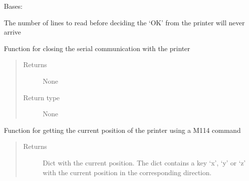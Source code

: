 \documentclass[letterpaper,10pt,english]{sphinxmanual}
\begin{document}
\begin{fulllineitems}
\label{\detokenize{index:diabase.diabase}}
\sphinxAtStartPar
Bases: 

\begin{fulllineitems}
\label{\detokenize{index:diabase.diabase.attempts}}
\sphinxAtStartPar
The number of lines to read before deciding the ‘OK’  from the printer will never arrive

\end{fulllineitems}


\begin{fulllineitems}
\label{\detokenize{index:diabase.diabase.close}}
\sphinxAtStartPar
Function for closing the serial communication with the printer
\begin{quote}\begin{description}
\item[{Returns}] \leavevmode
\sphinxAtStartPar
None

\item[{Return type}] \leavevmode
\sphinxAtStartPar
None

\end{description}\end{quote}

\end{fulllineitems}


\begin{fulllineitems}
\label{\detokenize{index:diabase.diabase.get_current_position}}
\sphinxAtStartPar
Function for getting the current position of the printer using a M114 command
\begin{quote}\begin{description}
\item[{Returns}] \leavevmode
\sphinxAtStartPar
Dict with the current position. The dict contains a key ‘x’, ‘y’ or ‘z’ with the current position in the corresponding direction.


\end{description}
\end{quote}
\end{fulllineitems}
\end{fulllineitems}
\end{document}
